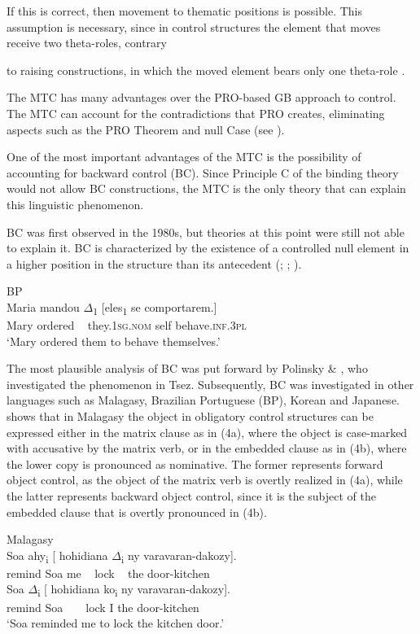 \documentclass[output=paper]{langsci/langscibook}
\begin{document}
If this is correct, then movement to thematic positions is possible. This assumption is necessary, since in control structures the element that moves receive two theta-roles, contrary

to raising constructions, in which the moved element bears only one theta-role \citep{Hornstein1999}.

The MTC has many advantages over the PRO-based GB approach to control. The MTC can account for the contradictions that PRO creates, eliminating aspects such as the PRO Theorem and null Case (see \citealt{Hornstein2001}). 

One of the most important advantages of the MTC is the possibility of accounting for backward control (BC). Since Principle C of the binding theory would not allow BC constructions, the MTC is the only theory that can explain this linguistic phenomenon. 

BC was first observed in the 1980s, but theories at this point were still not able to explain it. BC is characterized by the existence of a controlled null element in a higher position in the structure than its antecedent (\citealt{Farell1995}; \citealt{Rodrigues2004}; \citealt{Boeckx2006}). 

\ea%
    BP\label{ex:moreno:3}\\
    \gll Maria mandou ${\Delta}$\textsubscript{1} [eles\textsubscript{1} se comportarem.]  \\
         Mary ordered ~ they.\textsc{1sg.nom} self behave.\textsc{inf.3pl}\\
    \glt ‘Mary ordered them to behave themselves.’
    \z

The most plausible analysis of BC was put forward by Polinsky \& \citet{Potsdam2002}, who investigated the phenomenon in Tsez. Subsequently, BC was investigated in other languages such as Malagasy, Brazilian Portuguese (BP), Korean and Japanese. \citet{Potsdam2009} shows that in Malagasy the object in obligatory control structures can be expressed either in the matrix clause as in (4a), where the object is case-marked with accusative by the matrix verb, or in the embedded clause as in (4b), where the lower copy is pronounced as nominative. The former represents forward object control, as the object of the matrix verb is overtly realized in (4a), while the latter represents backward object control, since it is the subject of the embedded clause that is overtly pronounced in (4b). 

\ea%
    Malagasy \citep[755]{Potsdam2009}\label{ex:moreno:4}\\
    \ea
     Soa  ahy\textsubscript{i} [ hohidiana ${\Delta}$\textsubscript{i}   ny varavaran-dakozy].\\
         remind                 Soa   me   ~ lock ~ the door-kitchen\\
    \ex
     Soa  ${\Delta}$\textsubscript{i}        [ hohidiana ko\textsubscript{i}   ny varavaran-dakozy].\\
         remind                    Soa    ~ ~ lock          I      the door-kitchen\\
    \glt ‘Soa reminded me to lock the kitchen door.’
    \z
\z
\end{document}
